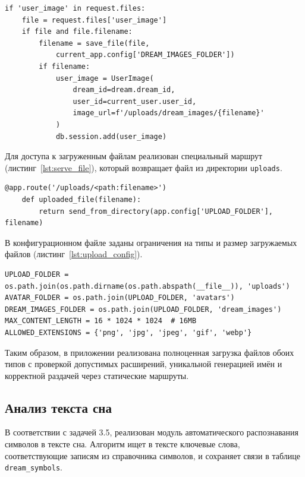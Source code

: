 \documentclass[14pt, a4paper]{extarticle}
\begin{document}
\begin{lstlisting}[caption={Загрузка изображения к сну}, label={lst:upload_dream_image}]
if 'user_image' in request.files:
    file = request.files['user_image']
    if file and file.filename:
        filename = save_file(file, 
            current_app.config['DREAM_IMAGES_FOLDER'])
        if filename:
            user_image = UserImage(
                dream_id=dream.dream_id,
                user_id=current_user.user_id,
                image_url=f'/uploads/dream_images/{filename}'
            )
            db.session.add(user_image)
\end{lstlisting}

Для доступа к загруженным файлам реализован специальный маршрут (листинг~\ref{lst:serve_file}), который возвращает файл из директории \texttt{uploads}.

\begin{lstlisting}[caption={Маршрут для раздачи загруженных файлов}, label={lst:serve_file}]
@app.route('/uploads/<path:filename>')
    def uploaded_file(filename):
        return send_from_directory(app.config['UPLOAD_FOLDER'], filename)
\end{lstlisting}

В конфигурационном файле заданы ограничения на типы и размер загружаемых файлов (листинг~\ref{lst:upload_config}).

\begin{lstlisting}[caption={Настройки загрузки файлов в config.py}, label={lst:upload_config}]
UPLOAD_FOLDER = os.path.join(os.path.dirname(os.path.abspath(__file__)), 'uploads')
AVATAR_FOLDER = os.path.join(UPLOAD_FOLDER, 'avatars')
DREAM_IMAGES_FOLDER = os.path.join(UPLOAD_FOLDER, 'dream_images')
MAX_CONTENT_LENGTH = 16 * 1024 * 1024  # 16MB
ALLOWED_EXTENSIONS = {'png', 'jpg', 'jpeg', 'gif', 'webp'}
\end{lstlisting}

Таким образом, в приложении реализована полноценная загрузка файлов обоих типов с проверкой допустимых расширений, уникальной генерацией имён и корректной раздачей через статические маршруты.
\subsection{Анализ текста сна}

В соответствии с задачей 3.5, реализован модуль автоматического распознавания символов в тексте сна. Алгоритм ищет в тексте ключевые слова, соответствующие записям из справочника символов, и сохраняет связи в таблице \texttt{dream\_symbols}.
\end{document}
